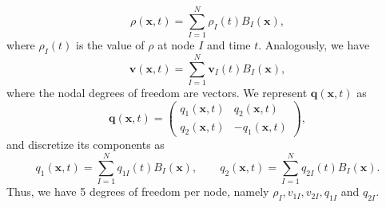 \begin{equation}
	\rho(\bm{x},t) = \sum_{I=1}^N \rho_I(t) B_I(\bm{x}),
\end{equation}
where $\rho_I(t)$ is the value of $\rho$ at node $I$ and time $t$. Analogously, we have 
\begin{equation}
	\bm{v}(\bm{x},t) = \sum_{I=1}^N\bm{v}_I(t) B_I(\bm{x}),
\end{equation}
where the nodal degrees of freedom are vectors. 
We represent $\bm{q}(\bm{x},t)$ as
\begin{equation}
	\bm{q}(\bm{x},t) = \begin{pmatrix}
		q_1(\bm{x},t) & q_2(\bm{x},t)\\
		q_2(\bm{x},t) & -q_1(\bm{x},t)
	\end{pmatrix},
\end{equation}
and discretize its components as
\begin{equation}
	q_1(\bm{x},t) = \sum_{I=1}^N q_{1I} (t) B_I(\bm{x}), \qquad  q_2(\bm{x},t) = \sum_{I=1}^N q_{2I} (t) B_I(\bm{x}).
\end{equation}
Thus, we have 5 degrees of freedom per node, namely $\rho_I, v_{1I}, v_{2I}, q_{1I}$ and $q_{2I}$.

